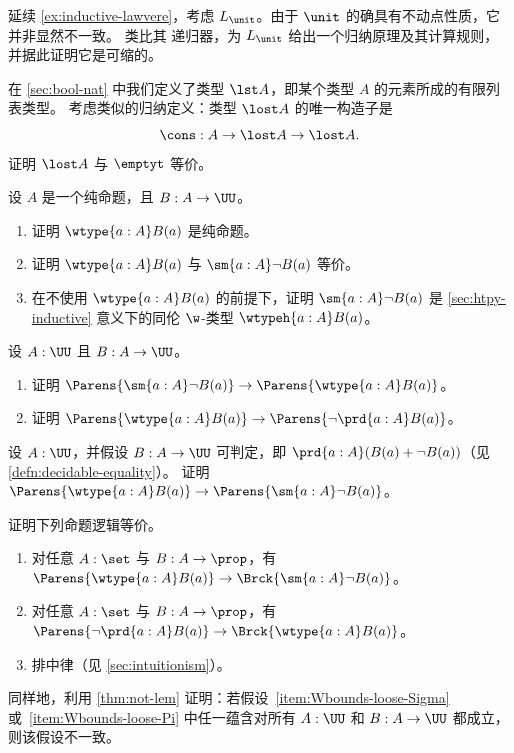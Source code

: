 \begin{ex}\label{ex:ilunit}
  延续 \cref{ex:inductive-lawvere}，考虑 $L_\unit$。由于 $\unit$ 的确具有不动点性质，它并非显然不一致。
  类比其 递归器，为 $L_\unit$ 给出一个归纳原理及其计算规则，并据此证明它是可缩的。
\end{ex}

\begin{ex}\label{ex:empty-inductive-type}
在 \cref{sec:bool-nat} 中我们定义了类型 $\lst A$，即某个类型 $A$ 的元素所成的有限列表类型。
考虑类似的归纳定义：类型 $\lost A$ 的唯一构造子是
\[ \cons: A \to \lost A \to \lost A. \]
证明 $\lost A$ 与 $\emptyt$ 等价。
\end{ex}

\begin{ex}\label{ex:Wprop}
  设 $A$ 是一个纯命题，且 $B:A\to \UU$。
  \begin{enumerate}
  \item 证明 $\wtype{a:A} B(a)$ 是纯命题。
  \item 证明 $\wtype{a:A} B(a)$ 与 $\sm{a:A} \neg B(a)$ 等价。
  \item 在不使用 $\wtype{a:A} B(a)$ 的前提下，证明 $\sm{a:A} \neg B(a)$ 是 \cref{sec:htpy-inductive} 意义下的同伦 $\w$-类型 $\wtypeh{a:A} B(a)$。
  \end{enumerate}
\end{ex}

\begin{ex}\label{ex:Wbounds}
  设 $A:\UU$ 且 $B:A\to \UU$。
  \begin{enumerate}
  \item 证明 $\Parens{\sm{a:A} \neg B(a)} \to \Parens{\wtype{a:A} B(a)}$。
  \item 证明 $\Parens{\wtype{a:A} B(a)} \to \Parens{\neg \prd{a:A} B(a)}$。
  \end{enumerate}
\end{ex}

\begin{ex}\label{ex:Wdec}
  设 $A:\UU$，并假设 $B:A\to \UU$ 可判定，即 $\prd{a:A} (B(a)+\neg B(a))$（见 \cref{defn:decidable-equality}）。
  证明 $\Parens{\wtype{a:A} B(a)} \to \Parens{\sm{a:A} \neg B(a)}$。
\end{ex}

\begin{ex}\label{ex:Wbounds-loose}
  证明下列命题逻辑等价。
  \begin{enumerate}
  \item 对任意 $A:\set$ 与 $B:A\to \prop$，有 $\Parens{\wtype{a:A} B(a)} \to \Brck{\sm{a:A} \neg B(a)}$。\label{item:Wbounds-loose-Sigma}
  \item 对任意 $A:\set$ 与 $B:A\to \prop$，有 $\Parens{\neg \prd{a:A} B(a)} \to \Brck{\wtype{a:A} B(a)}$。\label{item:Wbounds-loose-Pi}
  \item 排中律（见 \cref{sec:intuitionism}）。
  \end{enumerate}
  同样地，利用 \cref{thm:not-lem} 证明：若假设~\ref{item:Wbounds-loose-Sigma} 或~\ref{item:Wbounds-loose-Pi} 中任一蕴含对所有 $A:\UU$ 和 $B:A\to \UU$ 都成立，则该假设不一致。
\end{ex}

